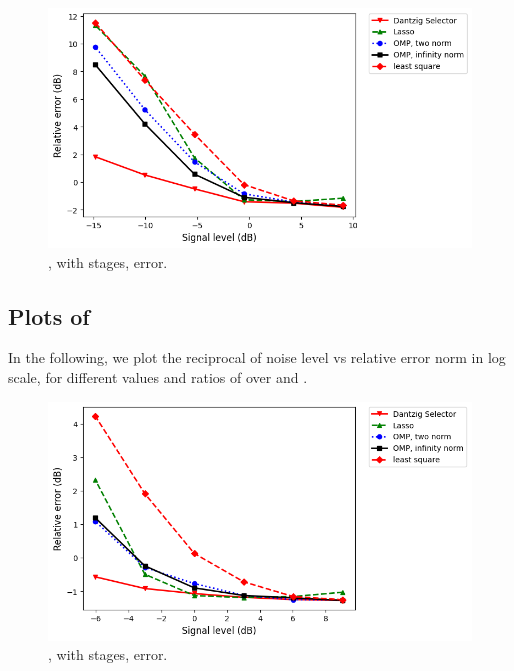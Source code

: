 \begin {figure} [H]
\includegraphics [width = \textwidth] {error-small-wide-four.png}
\caption {, with  stages, error.}
\end {figure}

\subsection {Plots of }

In the following, we plot the reciprocal of noise level vs relative error norm in log scale, for different values and ratios of  over  and .

\begin {figure} [H]
\includegraphics [width = \textwidth] {error-medium-square-two.png}
\caption {, with  stages, error.}
\end {figure}

